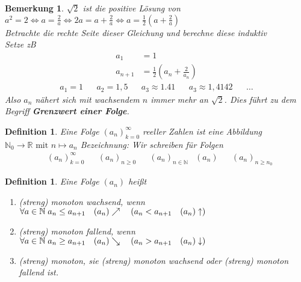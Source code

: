 \documentclass[a4paper,titlepage,oneside]{article}
\def\N{\ensuremath{\mathbb{N}} }
\def\R{\ensuremath{\mathbb{R}} }
\def\fa{\ensuremath{\forall}}
\def\sp{\hspace{0,1cm}}
\theoremstyle{thmstyle}
\newtheorem{defi}[satz]{Definition}
\newtheorem{bem}[satz]{Bemerkung}
\theoremstyle{subthmstyle}
\begin{document}
\begin{bem}
\( \sqrt{2} \) ist die positive Lösung von $ \displaystyle a^2 = 2 \Leftrightarrow a = \frac{2}{a} \Leftrightarrow  2a = a + \frac{2}{a} \Leftrightarrow a= \frac{1}{2}\left(a + \frac{2}{a}\right)$ \\
Betrachte die rechte Seite dieser Gleichung und berechne diese induktiv\\
Setze zB
\begin{align*}
a_1 &= 1\\
a_{n+1} &= \frac{1}{2}\left(a_n + \frac{2}{a_n}\right)
\end{align*}
\begin{align*}
a_1 = 1 && a_2 = 1,5 && a_3 \approx 1.41 && a_3 \approx 1,4142 &&\dots
\end{align*}
Also \(a_n\) nähert sich mit wachsendem \(n\) immer mehr an \(\sqrt{2}\). Dies führt zu dem Begriff \textbf{Grenzwert einer Folge}.
\end{bem}

\begin{defi}
Eine Folge $(a_n)_{k=0}^{\infty}$ reeller Zahlen ist eine Abbildung $\N_0 \rightarrow \R\text{ mit } n \mapsto a_n$
Bezeichnung: Wir schreiben für Folgen
\begin{align*}
&(a_n)_{k=0}^{\infty} && (a_n)_{n\ge0} && (a_n)_{n\in\N} & (a_n) && (a_n)_{n\ge n_0}
\end{align*}
\end{defi}

\newpage
\begin{defi}
Eine Folge \((a_n)\) heißt
\begin{enumerate}
\item (streng) monoton wachsend, wenn \( \fa a \in \N \sp a_n \le a_{n+1}	\quad (a_n)\nearrow	\quad (a_n < a_{n+1} \quad (a_n)\uparrow)\)
\item (streng) monoton fallend, wenn \( \fa a \in \N \sp a_n \ge a_{n+1}	\quad (a_n)\searrow	\quad (a_n > a_{n+1} \quad (a_n)\downarrow)\)
\item (streng) monoton, sie (streng) monoton wachsend oder (streng) monoton fallend ist.
\end{enumerate}
\end{defi}
\end{document}
